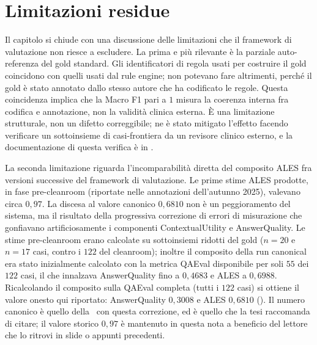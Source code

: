 \section{Limitazioni residue}
\label{sec:limitazioni}

Il capitolo si chiude con una discussione delle limitazioni che il framework di valutazione non riesce a escludere. La prima e più rilevante è la parziale auto-referenza del gold standard. Gli identificatori di regola usati per costruire il gold coincidono con quelli usati dal rule engine; non potevano fare altrimenti, perché il gold è stato annotato dallo stesso autore che ha codificato le regole. Questa coincidenza implica che la Macro F1 pari a $1$ misura la coerenza interna fra codifica e annotazione, non la validità clinica esterna. È una limitazione strutturale, non un difetto correggibile; ne è stato mitigato l'effetto facendo verificare un sottoinsieme di casi-frontiera da un revisore clinico esterno, e la documentazione di questa verifica è in .

La seconda limitazione riguarda l'incomparabilità diretta del composito ALES fra versioni successive del framework di valutazione. Le prime stime ALES prodotte, in fase pre-cleanroom (riportate nelle annotazioni dell'autunno 2025), valevano circa $0{,}97$. La discesa al valore canonico $0{,}6810$ non è un peggioramento del sistema, ma il risultato della progressiva correzione di errori di misurazione che gonfiavano artificiosamente i componenti ContextualUtility e AnswerQuality. Le stime pre-cleanroom erano calcolate su sottoinsiemi ridotti del gold ($n=20$ e $n=17$ casi, contro i $122$ del cleanroom); inoltre il composito della run canonical era stato inizialmente calcolato con la metrica QAEval disponibile per soli $55$ dei $122$ casi, il che innalzava AnswerQuality fino a $0{,}4683$ e ALES a $0{,}6988$. Ricalcolando il composito sulla QAEval completa (tutti i $122$ casi) si ottiene il valore onesto qui riportato: AnswerQuality $0{,}3008$ e ALES $0{,}6810$ (). Il numero canonico è quello della \cleanroomrun\ con questa correzione, ed è quello che la tesi raccomanda di citare; il valore storico $0{,}97$ è mantenuto in questa nota a beneficio del lettore che lo ritrovi in slide o appunti precedenti.

